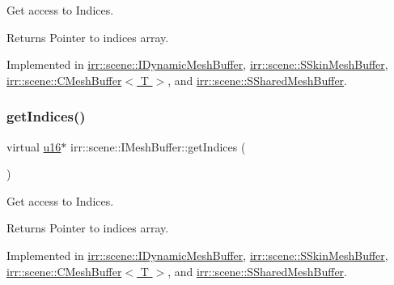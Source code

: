 Get access to Indices. 

\begin{DoxyReturn}{Returns}
Pointer to indices array. 
\end{DoxyReturn}


Implemented in \hyperlink{classirr_1_1scene_1_1IDynamicMeshBuffer_ab762d23eb5666125dad83ce20f15b4dd}{irr\+::scene\+::\+I\+Dynamic\+Mesh\+Buffer}, \hyperlink{structirr_1_1scene_1_1SSkinMeshBuffer_ac5f16b3fca6454afe01939a2c1e23d08}{irr\+::scene\+::\+S\+Skin\+Mesh\+Buffer}, \hyperlink{classirr_1_1scene_1_1CMeshBuffer_a23af7e8ffb2ba674d1dd4448cea288bf}{irr\+::scene\+::\+C\+Mesh\+Buffer$<$ T $>$}, and \hyperlink{structirr_1_1scene_1_1SSharedMeshBuffer_a3ddd96966e9bbb409536dd8951018b69}{irr\+::scene\+::\+S\+Shared\+Mesh\+Buffer}.

\mbox{\label{classirr_1_1scene_1_1IMeshBuffer_a3d33a561023314677361e30cf07ae429}} 
\subsubsection{\texorpdfstring{get\+Indices()}{getIndices()}\hspace{0.1cm}{\footnotesize\ttfamily [2/2]}}
{\footnotesize\ttfamily virtual \hyperlink{namespaceirr_ae9f8ec82692ad3b83c21f555bfa70bcc}{u16}$\ast$ irr\+::scene\+::\+I\+Mesh\+Buffer\+::get\+Indices (\begin{DoxyParamCaption}{ }\end{DoxyParamCaption})\hspace{0.3cm}{\ttfamily [pure virtual]}}



Get access to Indices. 

\begin{DoxyReturn}{Returns}
Pointer to indices array. 
\end{DoxyReturn}


Implemented in \hyperlink{classirr_1_1scene_1_1IDynamicMeshBuffer_a556d8107ac44cbb16892f54370e32812}{irr\+::scene\+::\+I\+Dynamic\+Mesh\+Buffer}, \hyperlink{structirr_1_1scene_1_1SSkinMeshBuffer_ada6af60ed1545fd0b3372ddbb71ada5e}{irr\+::scene\+::\+S\+Skin\+Mesh\+Buffer}, \hyperlink{classirr_1_1scene_1_1CMeshBuffer_a34a85f4868776d4cf312cdece5326c89}{irr\+::scene\+::\+C\+Mesh\+Buffer$<$ T $>$}, and \hyperlink{structirr_1_1scene_1_1SSharedMeshBuffer_a16f7c525acba8d913b8de49dee869465}{irr\+::scene\+::\+S\+Shared\+Mesh\+Buffer}.

